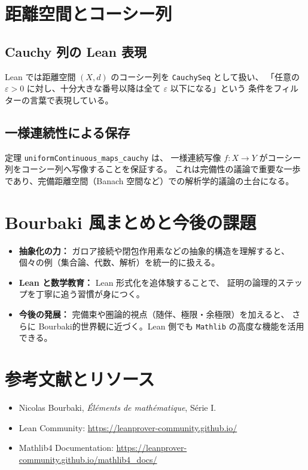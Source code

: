 \documentclass[a4paper]{ltjsarticle}
\theoremstyle{definition}
\theoremstyle{plain}
\theoremstyle{remark}
\begin{document}
\section{距離空間とコーシー列}
\subsection{Cauchy 列の Lean 表現}
Lean では距離空間 $(X, d)$ のコーシー列を \texttt{CauchySeq} として扱い、
「任意の $\varepsilon > 0$ に対し、十分大きな番号以降は全て $\varepsilon$ 以下になる」という
条件をフィルターの言葉で表現している。

\subsection{一様連続性による保存}
定理 \texttt{uniformContinuous\_maps\_cauchy} は、
一様連続写像 $f\colon X \to Y$ がコーシー列をコーシー列へ写像することを保証する。
これは完備性の議論で重要な一歩であり、完備距離空間（Banach 空間など）での解析学的議論の土台になる。

\section{Bourbaki 風まとめと今後の課題}
\begin{itemize}
  \item \textbf{抽象化の力：} ガロア接続や閉包作用素などの抽象的構造を理解すると、
        個々の例（集合論、代数、解析）を統一的に扱える。
  \item \textbf{Lean と数学教育：} Lean 形式化を追体験することで、
        証明の論理的ステップを丁寧に追う習慣が身につく。
  \item \textbf{今後の発展：} 完備束や圏論的視点（随伴、極限・余極限）を加えると、
        さらに Bourbaki的世界観に近づく。Lean 側でも \texttt{Mathlib} の高度な機能を活用できる。
\end{itemize}

\section*{参考文献とリソース}
\begin{itemize}
  \item Nicolas Bourbaki, \textit{Éléments de mathématique}, Série I.
  \item Lean Community: \url{https://leanprover-community.github.io/}
  \item Mathlib4 Documentation: \url{https://leanprover-community.github.io/mathlib4_docs/}
\end{itemize}
\end{document}
